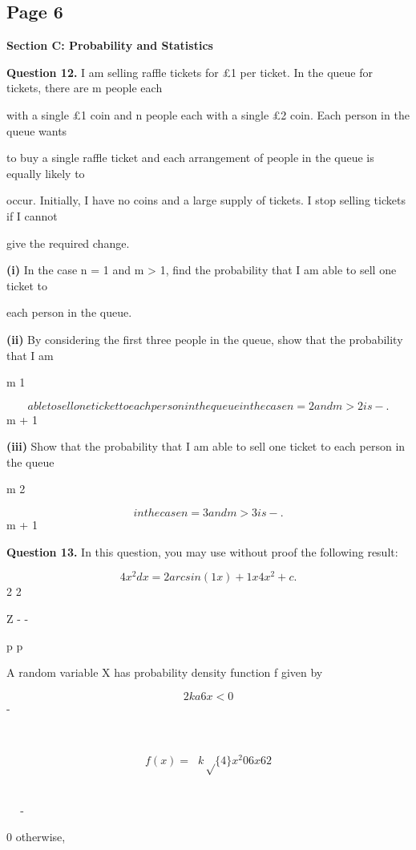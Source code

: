 \documentclass[12pt]{article}
\begin{document}
\subsection*{Page 6}
\begin{flushleft}
\bigskip\textbf{Section C: Probability and Statistics}\par
\bigskip\textbf{Question 12.} I am selling raffle tickets for \pounds 1 per ticket. In the queue for tickets, there are m people each\par
with a single \pounds 1 coin and n people each with a single \pounds 2 coin. Each person in the queue wants\par
to buy a single raffle ticket and each arrangement of people in the queue is equally likely to\par
occur. Initially, I have no coins and a large supply of tickets. I stop selling tickets if I cannot\par
give the required change.\par
\textbf{(i)} In the case n = 1 and m > 1, find the probability that I am able to sell one ticket to\par
each person in the queue.\par
\textbf{(ii)} By considering the first three people in the queue, show that the probability that I am\par
m 1\par
\[able to sell one ticket to each person in the queue in the case n = 2 and m > 2 is - .\]
m + 1\par
\textbf{(iii)} Show that the probability that I am able to sell one ticket to each person in the queue\par
m 2\par
\[in the case n = 3 and m > 3 is - .\]
m + 1\par
\bigskip\textbf{Question 13.} In this question, you may use without proof the following result:\par
\[4 x^2 dx = 2 arcsin( 1 x) + 1 x 4 x^2 + c .\]
2 2\par
Z - -\par
p p\par
A random variable X has probability density function f given by\par
\[2k a 6 x < 0\]
-\par
\par
\[f(x) =  k\sqrt\{4\} x^2 0 6 x 6 2\]
\par
  -\par
0 otherwise,\par
\par

\end{flushleft}
\end{document}
